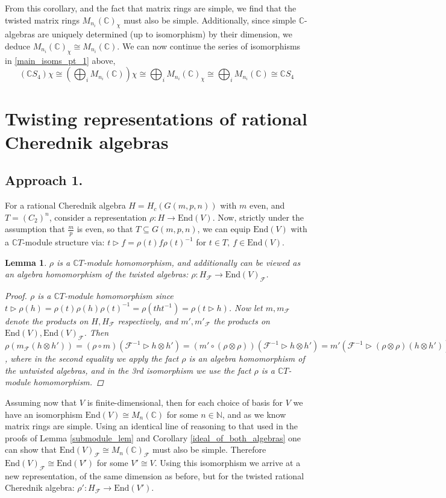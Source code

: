 \documentclass[11pt]{article}
\newcommand{\bb}{\medbreak}
\newcommand{\nt}{\noindent}
\newcommand{\N}{\mathbb{N}}
\newcommand{\Cc}{\mathbb{C}}
\newcommand{\End}{\text{End}}
\newtheorem{lemma}{Lemma}[section]
\theoremstyle{definition}
\begin{document}
\nt From this corollary, and the fact that matrix rings are simple, we find that the twisted matrix rings $M_{n_i}(\Cc)_\chi$ must also be simple. Additionally, since simple $\Cc$-algebras are uniquely determined (up to isomorphism) by their dimension, we deduce $M_{n_i}(\Cc)_\chi\cong M_{n_i}(\Cc)$. We can now continue the series of isomorphisms in \eqref{main_isoms_pt_1} above,
$$(\mathbb{C}S_4)\chi\cong (\bigoplus_{i}M_{n_i}(\mathbb{C}))\chi\cong \bigoplus_i M_{n_i}(\mathbb{C})_\chi \cong \bigoplus_i M_{n_i}(\mathbb{C})\cong \Cc S_4 $$ 

\section{Twisting representations of rational Cherednik algebras}

\subsection{Approach 1.}
For a rational Cherednik algebra $H=H_c(G(m,p,n))$ with $m$ even, and $T=(C_2)^n$, consider a representation $\rho:H\rightarrow \End(V)$. Now, strictly under the assumption that $\frac{m}{p}$ is even, so that $T\subseteq G(m,p,n)$, we can equip $\End(V)$ with a $\Cc T$-module structure via: $t\rhd f=\rho(t)f\rho(t)^{-1}$ for $t\in T,\ f\in \End(V)$.
\begin{lemma}\label{twisted_rep} $\rho$ is a $\Cc T$-module homomorphism, and additionally can be viewed as an algebra homomorphism of the twisted algebras: $\rho: H_\mathcal{F}\rightarrow \End(V)_\mathcal{F}$.
\begin{proof}
$\rho$ is a $\Cc T$-module homomorphism since $t\rhd \rho(h)=\rho(t)\rho(h)\rho(t)^{-1}=\rho(tht^{-1})=\rho(t\rhd h)$. Now let $m, m_\mathcal{F}$ denote the products on $H, H_\mathcal{F}$ respectively, and $m', m'_\mathcal{F}$ the products on $\End(V),\End(V)_\mathcal{F}$. Then $\rho(m_\mathcal{F}(h\otimes h'))=(\rho \circ m)(\mathcal{F}^{-1}\rhd h\otimes h') = (m' \circ (\rho\otimes \rho))(\mathcal{F}^{-1}\rhd h\otimes h')=m'(\mathcal{F}^{-1}\rhd (\rho\otimes \rho)(h\otimes h'))=m'_\mathcal{F}\circ (\rho\otimes \rho)(h\otimes h')$, where in the second equality we apply the fact $\rho$ is an algebra homomorphism of the untwisted algebras, and in the 3rd isomorphism we use the fact $\rho$ is a $\Cc T$-module homomorphism.
\end{proof}
\end{lemma}

\nt Assuming now that $V$ is finite-dimensional, then for each choice of basis for $V$ we have an isomorphism $\End(V)\cong M_n(\Cc)$ for some $n\in \N$, and as we know matrix rings are simple. Using an identical line of reasoning to that used in the proofs of Lemma \ref{submodule_lem} and Corollary \ref{ideal_of_both_algebras} one can show that $\End(V)_\mathcal{F}\cong M_n(\Cc)_\mathcal{F}$ must also be simple. Therefore $\End(V)_\mathcal{F}\cong \End(V')$ for some $V' \cong V$. Using this isomorphism we arrive at a new representation, of the same dimension as before, but for the twisted rational Cherednik algebra: $\rho':H_\mathcal{F}\rightarrow \End(V')$.\bb
\end{document}
